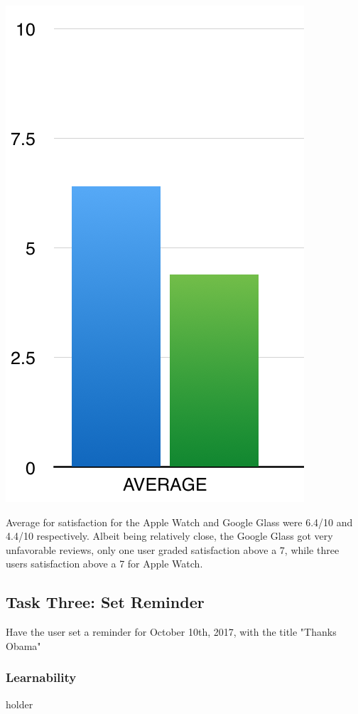 \documentclass[paper=a4, fontsize=11pt]{scrartcl}	%
\numberwithin{equation}{section}															%
\numberwithin{figure}{section}																%
\numberwithin{table}{section}																%
\begin{document}
\includegraphics[scale=0.8]{task2satav}

Average for satisfaction for the Apple Watch and Google Glass were 6.4/10 and 4.4/10 respectively. Albeit being relatively close, the Google Glass got very unfavorable reviews, only one user graded satisfaction above a 7, while three users satisfaction above a 7 for Apple Watch.

\subsection{Task Three: Set Reminder}
Have the user set  a reminder for October 10th, 2017, with the title "Thanks Obama"

\subsubsection{Learnability}
holder
\end{document}
